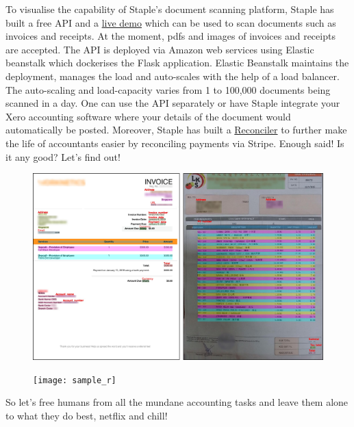 \documentclass[11pt]{article}
\begin{document}
\noindent To visualise the capability of Staple's document scanning platform, Staple has built a free API and a \href{https://demo.staple.io/}{live demo} which can be used to scan documents such as invoices and receipts. At the moment, pdfs and images of invoices and receipts are accepted. The API is deployed via Amazon web services using Elastic beanstalk which dockerises the Flask application. Elastic Beanstalk maintains the deployment, manages the load and auto-scales with the help of a load balancer. The auto-scaling and load-capacity varies from 1 to 100,000 documents being scanned in a day. One can use the API separately or have Staple integrate your Xero accounting software where your details of the document would automatically be posted. Moreover, Staple has built a \href{https://reconciler.io/}{Reconciler} to further make the life of accountants easier by reconciling payments via Stripe. Enough said! Is it any good? Let's find out!


 \begin{figure}[h]
\centering
\includegraphics[scale= 0.22]{sample_i}

\label{default}
\end{figure}

 \begin{figure}[h]
\centering
\texttt{[image: sample\_r]}

\label{default}
\end{figure}


\noindent So let's free humans from all the mundane accounting tasks and leave them alone to what they do best, netflix and chill! 







 
\end{document}
